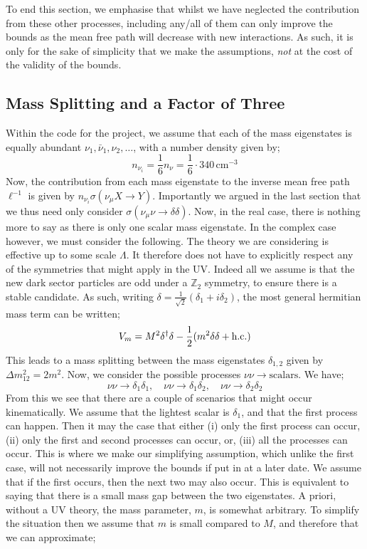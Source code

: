 \documentclass[10pt]{article}
\begin{document}
To end this section, we emphasise that whilst we have neglected the contribution from these other processes, including any/all of them can only improve the bounds as the mean free path will decrease with new interactions. As such, it is only for the sake of simplicity that we make the assumptions, \textit{not} at the cost of the validity of the bounds.
\subsection{Mass Splitting and a Factor of Three}
Within the code for the project, we assume that each of the mass eigenstates is equally abundant $\nu_1, \bar{\nu}_1, \nu_2, \ldots$, with a number density given by;
\begin{equation}
  n_{\nu_i} = \frac{1}{6} n_\nu = \frac{1}{6} \cdot 340 \, \textrm{cm}^{-3}
\end{equation}
Now, the contribution from each mass eigenstate to the inverse mean free path $\ell^{-1}$ is given by $n_{\nu_i} \sigma(\nu_\mu X \rightarrow Y )$. Importantly we argued in the last section that we thus need only consider $\sigma(\nu_\mu \nu \rightarrow \delta \delta)$. Now, in the real case, there is nothing more to say as there is only one scalar mass eigenstate. In the complex case however, we must consider the following. The theory we are considering is effective up to some scale $\Lambda$. It therefore does not have to explicitly respect any of the symmetries that might apply in the UV. Indeed all we assume is that the new dark sector particles are odd under a $\mathbb{Z}_2$ symmetry, to ensure there is a stable candidate. As such, writing $\delta = \tfrac{1}{\sqrt{2}}(\delta_1 + i \delta_2)$, the most general hermitian mass term can be written;
\begin{equation}
  V_m = M^2 \delta^{\dagger} \delta - \frac{1}{2}(m^2 \delta \delta + \textrm{h.c.})
\end{equation}
This leads to a mass splitting between the mass eigenstates $\delta_{1,2}$ given by $\Delta m_{12}^2 = 2m^2$. Now, we consider the possible processes $\nu\nu \rightarrow \textrm{scalars}$. We have;
\begin{equation*}
\nu\nu \rightarrow \delta_1 \delta_1, \quad \nu\nu \rightarrow \delta_1 \delta_2, \quad \nu\nu \rightarrow \delta_2 \delta_2
\end{equation*}
From this we see that there are a couple of scenarios that might occur kinematically. We assume that the lightest scalar is $\delta_1$, and that the first process can happen. Then it may the case that either (i) only the first process can occur, (ii) only the first and second processes can occur, or, (iii) all the processes can occur. This is where we make our simplifying assumption, which unlike the first case, will not necessarily improve the bounds if put in at a later date. We assume that if the first occurs, then the next two may also occur. This is equivalent to saying that there is a small mass gap between the two eigenstates. A priori, without a UV theory, the mass parameter, $m$, is somewhat arbitrary. To simplify the situation then we assume that $m$ is small compared to $M$, and therefore that we can approximate;
\end{document}
